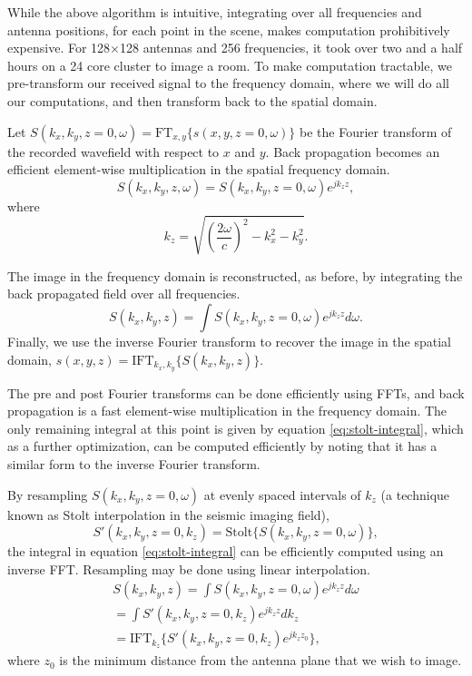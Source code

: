 \documentclass[twocolumn]{article}
\begin{document}
While the above algorithm is intuitive, integrating over all frequencies and antenna positions, for each point in the scene, makes computation prohibitively expensive. For 128$\times$128 antennas and 256 frequencies, it took over two and a half hours on a 24 core cluster to image a room. To make computation tractable, we pre-transform our received signal to the frequency domain, where we will do all our computations, and then transform back to the spatial domain.

Let $S(k_x,k_y,z=0,\omega) = \text{FT}_{x,y} \{ s(x, y, z=0, \omega) \}$ be the Fourier transform of the recorded wavefield with respect to $x$ and $y$. Back propagation becomes an efficient element-wise multiplication in the spatial frequency domain.
\begin{equation}
	S(k_x, k_y, z, \omega) = S(k_x, k_y, z=0, \omega) e^{j k_z z},
\end{equation}
where
\begin{equation}
  	k_z = \sqrt{ (\frac{2 \omega}{c}) ^ 2 - k_x^2 - k_y^2}.
\end{equation}

The image in the frequency domain is reconstructed, as before, by integrating the back propagated field over all frequencies.
\begin{equation}
	S(k_x, k_y, z) = \int S(k_x, k_y, z=0, \omega) e^{j k_z z} d\omega. \label{eq:stolt-integral}
\end{equation}
Finally, we use the inverse Fourier transform to recover the image in the spatial domain, $s(x,y,z) = \text{IFT}_{k_x, k_y} \{ S(k_x, k_y, z) \}$. 

The pre and post Fourier transforms can be done efficiently using FFTs, and back propagation is a fast element-wise multiplication in the frequency domain. The only remaining integral at this point is given by equation \ref{eq:stolt-integral}, which as a further optimization, can be computed efficiently by noting that it has a similar form to the inverse Fourier transform. 

By resampling $S(k_x, k_y, z=0, \omega)$ at evenly spaced intervals of $k_z$ (a technique known as Stolt interpolation in the seismic imaging field),
\begin{equation}
	S'(k_x, k_y, z=0, k_z) = \text{Stolt}\{ S(k_x, k_y, z=0, \omega) \},
\end{equation}
the integral in equation \ref{eq:stolt-integral} can be efficiently computed using an inverse FFT. Resampling may be done using linear interpolation.
\begin{gather}
	S(k_x, k_y, z) = \int S(k_x, k_y, z=0, \omega) e^{j k_z z} d\omega 	\nonumber \\
	= \int S'(k_x, k_y, z=0, k_z) e^{j k_z z} dk_z	\nonumber \\
	= \text{IFT}_{k_z} \{ S'(k_x, k_y, z=0, k_z) e^{j k_z z_0} \},
\end{gather}
where $z_0$ is the minimum distance from the antenna plane that we wish to image.
\end{document}
